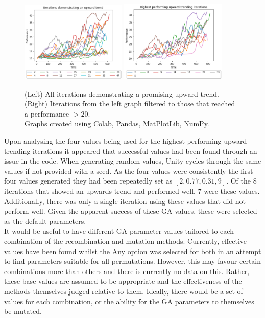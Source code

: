 \documentclass{article}
\begin{document}
\begin{figure}[H]
\centering
\includegraphics[width=0.45\textwidth]{gaPatternIterations}
\includegraphics[width=0.45\textwidth]{gafilteredIterations}
\caption{(Left) All iterations demonstrating a promising upward trend.\\
(Right) Iterations from the left graph filtered to those that reached a performance $>20$.\\
Graphs created using Colab, \citep{colab} Pandas, \citep{pd} MatPlotLib, \citep{plt} NumPy. \citep{np}}
\end{figure}

Upon analysing the four values being used for the highest performing upward-trending iterations it appeared that successful values had been found through an issue in the code. When generating random values, Unity cycles through the same values if not provided with a seed.  As the four values were consistently the first four values generated they had been repeatedly set as $[2, 0.77, 0.31, 9]$. Of the 8 iterations that showed an upwards trend and performed well, 7 were these values. Additionally, there was only a single iteration using these values that did not perform well. Given the apparent success of these GA values, these were selected as the default parameters. \\
It would be useful to have different GA parameter values tailored to each combination of the recombination and mutation methods. Currently, effective values have been found whilst the Any option was selected for both in an attempt to find parameters suitable for all permutations. However, this may favour certain combinations more than others and there is currently no data on this. Rather, these base values are assumed to be appropriate and the effectiveness of the methods themselves judged relative to them. Ideally, there would be a set of values for each combination, or the ability for the GA parameters to themselves be mutated. \\
\end{document}
